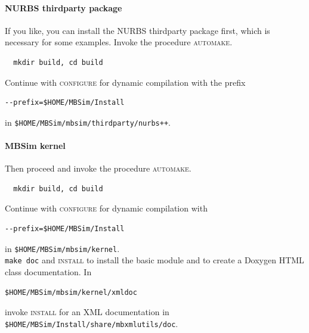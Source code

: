 \paragraph{NURBS thirdparty package}
If you like, you can install the NURBS thirdparty package first, which is necessary for some examples. Invoke the procedure \textsc{automake}.
\begin{verbatim}
  mkdir build, cd build
\end{verbatim}
Continue with \textsc{configure} for dynamic compilation with the prefix
\begin{verbatim}
--prefix=$HOME/MBSim/Install
\end{verbatim}
in \texttt{\$HOME/MBSim/mbsim/thirdparty/nurbs++}.
%
\paragraph{MBSim kernel}
Then proceed and invoke the procedure \textsc{automake}.
\begin{verbatim}
  mkdir build, cd build
\end{verbatim}
Continue with \textsc{configure} for dynamic compilation with
\begin{verbatim}
--prefix=$HOME/MBSim/Install
\end{verbatim}
in \texttt{\$HOME/MBSim/mbsim/kernel}.\\
%
\texttt{make doc} and \textsc{install} to install the basic module and to create a Doxygen HTML class documentation. In
\begin{verbatim}
$HOME/MBSim/mbsim/kernel/xmldoc
\end{verbatim}
invoke \textsc{install} for an XML documentation in\\
\texttt{\$HOME/MBSim/Install/share/mbxmlutils/doc}.
%
